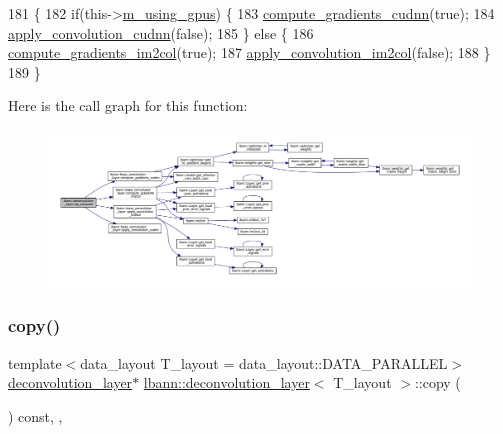 \begin{DoxyCode}
181                              \{
182     \textcolor{keywordflow}{if}(this->\hyperlink{classlbann_1_1Layer_af7881cb5eff5207c15fa835d65462e8f}{m\_using\_gpus}) \{
183       \hyperlink{classlbann_1_1base__convolution__layer_ae46e6a975c443792c606817878dc4446}{compute\_gradients\_cudnn}(\textcolor{keyword}{true});
184       \hyperlink{classlbann_1_1base__convolution__layer_a1c6e967ab0c66cfa0d27f7abfbbf2be8}{apply\_convolution\_cudnn}(\textcolor{keyword}{false});
185     \} \textcolor{keywordflow}{else} \{
186       \hyperlink{classlbann_1_1base__convolution__layer_a8cb0b4fb33f058ce6c211ebaf6a17f63}{compute\_gradients\_im2col}(\textcolor{keyword}{true});
187       \hyperlink{classlbann_1_1base__convolution__layer_a0710d46aa54d92f94de920ed37f6ef11}{apply\_convolution\_im2col}(\textcolor{keyword}{false});
188     \}
189   \}
\end{DoxyCode}
Here is the call graph for this function\+:\nopagebreak
\begin{figure}[H]
\begin{center}
\leavevmode
\includegraphics[width=350pt]{classlbann_1_1deconvolution__layer_a70649662ff27ddacf0f5584829022b72_cgraph}
\end{center}
\end{figure}
\mbox{\label{classlbann_1_1deconvolution__layer_aac6d10cbe30d5fcfed0a584321012b3a}} 
\subsubsection{\texorpdfstring{copy()}{copy()}}
{\footnotesize\ttfamily template$<$data\+\_\+layout T\+\_\+layout = data\+\_\+layout\+::\+D\+A\+T\+A\+\_\+\+P\+A\+R\+A\+L\+L\+EL$>$ \\
\hyperlink{classlbann_1_1deconvolution__layer}{deconvolution\+\_\+layer}$\ast$ \hyperlink{classlbann_1_1deconvolution__layer}{lbann\+::deconvolution\+\_\+layer}$<$ T\+\_\+layout $>$\+::copy (\begin{DoxyParamCaption}{ }\end{DoxyParamCaption}) const\hspace{0.3cm}{\ttfamily [inline]}, {\ttfamily [override]}, {\ttfamily [virtual]}}

